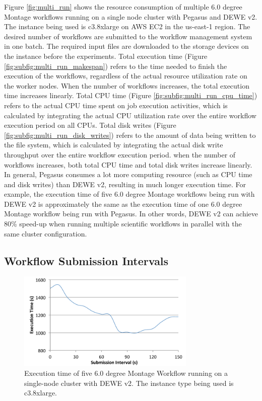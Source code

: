 Figure \ref{fig:multi_run} shows the resource consumption of multiple 6.0 degree Montage workflows running on a single node cluster with Pegasus and DEWE v2. The instance being used  is c3.8xlarge on AWS EC2 in the us-east-1 region. The desired number of workflows are submitted to the workflow management system in one batch. The required input files are downloaded to the storage devices on the instance before the experiments. Total execution time (Figure \ref{fig:subfig:multi_run_makespan}) refers to the time needed to finish the execution of the workflows, regardless of the actual resource utilization rate on the worker nodes. When the number of workflows increases, the total execution time increases linearly. Total CPU time (Figure \ref{fig:subfig:multi_run_cpu_time}) refers to the actual CPU time spent on job execution activities, which is calculated by integrating the actual CPU utilization rate over the entire workflow execution period on all CPUs. Total disk writes (Figure \ref{fig:subfig:multi_run_disk_writes}) refers to the amount of data being written to the file system, which is calculated by integrating the actual disk write throughput over the entire workflow execution period. when the number of workflows increases, both total CPU time and total disk writes increase linearly. In general, Pegasus consumes a lot more computing resource (such as CPU time and disk writes) than DEWE v2, resulting in much longer execution time. For example, the execution time of five 6.0 degree Montage workflows being run with DEWE v2 is approximately the same as the execution time of one 6.0 degree Montage workflow being run with Pegasus. In other words, DEWE v2 can achieve 80\% speed-up when running multiple scientific workflows in parallel with the same cluster configuration. 



\subsection{Workflow Submission Intervals}
\label{sec:subsec:submission}


\begin{figure}[!t]
	\centering
	\hspace{-10pt}
	\includegraphics[width=8.5cm]{dewe_v2_submission_intervals}
    \vspace{5pt}
	\caption{Execution time of five 6.0 degree Montage Workflow running on a single-node cluster with DEWE v2. The instance type being used is c3.8xlarge.}
	\label{fig:dewe_v2_submission}
\end{figure}




